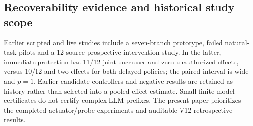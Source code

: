 \documentclass[10pt]{article}
\begin{document}
\subsection{Recoverability evidence and historical study scope}
\begin{table}[!htbp]\small\centering\caption{Selected prefix evidence labels. Categories shown are not exhaustive; no complex-prefix formal certificates exist.}\label{tab:prefix}
\end{table}
Earlier scripted and live studies include a seven-branch prototype, failed natural-task pilots and a 12-source prospective intervention study. In the latter, immediate protection has 11/12 joint successes and zero unauthorized effects, versus 10/12 and two effects for both delayed policies; the paired interval is wide and $p=1$. Earlier candidate controllers and negative results are retained as history rather than selected into a pooled effect estimate. Small finite-model certificates do not certify complex LLM prefixes. The present paper prioritizes the completed actuator/probe experiments and auditable V12 retrospective results.
\end{document}
